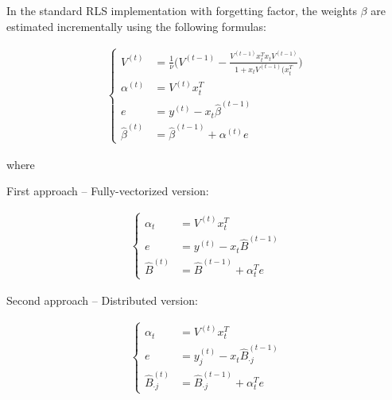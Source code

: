 In the standard RLS implementation with forgetting factor,
the weights $\beta$ are estimated incrementally using the following formulas:

\begin{align}
\begin{cases}
    V^{(t)} & = \frac{1}{\nu} \Bigg( V^{(t-1)} - \frac{V^{(t-1)} x_t^T x_t V^{(t-1)}}{1 + x_t V^{(t-1)} (x_t^T} \Bigg) \\
    \alpha^{(t)} & = V^{(t)} x_t^T \\
    e & = y^{(t)} - x_t \hat{\beta}^{(t-1)} \\
    \hat{\beta}^{(t)} & = \hat{\beta}^{(t-1)} + \alpha^{(t)} e
\end{cases}
\end{align}

where 

First approach -- Fully-vectorized version:

\begin{align}
\begin{cases}
    \alpha_t & = V^{(t)} x_t^T \\
    e & = y^{(t)} - x_t \hat{B}^{(t-1)} \\
    \hat{B}^{(t)} & = \hat{B}^{(t-1)} + \alpha_t^T e
\end{cases}
\end{align}

Second approach -- Distributed version:

\begin{align}
\begin{cases}
    \alpha_t & = V^{(t)} x_t^T \\
    e & = y_j^{(t)} - x_t \hat{B}_{\cdot j}^{(t-1)} \\
    \hat{B}_{\cdot j}^{(t)} & = \hat{B}_{\cdot j}^{(t-1)} + \alpha_t^T e
\end{cases}
\end{align}


